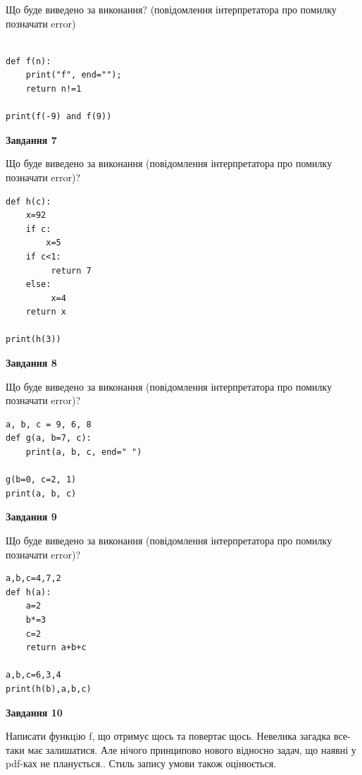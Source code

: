 \documentclass[12pt, ukrainian]{article}
\begin{document}
{\begin {large}
Що буде виведено за виконання? (повідомлення інтерпретатора про помилку позначати error)\par
\begin{verbatim}

def f(n):
    print("f", end="");
    return n!=1

print(f(-9) and f(9))
\end{verbatim}

{\begin {center}\textbf{Завдання 7}\end {center}}

Що буде виведено за виконання (повідомлення інтерпретатора про помилку позначати error)?\par
\begin{verbatim}
def h(c):
    x=92
    if c: 
        x=5
    if c<1:
         return 7
    else:
         x=4
    return x

print(h(3))
\end{verbatim}

{\begin {center}\textbf{Завдання 8}\end {center}}

Що буде виведено за виконання (повідомлення інтерпретатора про помилку позначати error)?\par
\begin{verbatim}
a, b, c = 9, 6, 8
def g(a, b=7, c):
    print(a, b, c, end=" ")

g(b=0, c=2, 1)
print(a, b, c)
\end{verbatim}

{\begin {center}\textbf{Завдання 9}\end {center}}

Що буде виведено за виконання (повідомлення інтерпретатора про помилку позначати error)?\par
\begin{verbatim}
a,b,c=4,7,2
def h(a):
    a=2
    b*=3
    c=2
    return a+b+c

a,b,c=6,3,4
print(h(b),a,b,c)
\end{verbatim}

{\begin {center}\textbf{Завдання 10}\end {center}}


Написати функцiю f, що отримує щось та повертає щось. Невелика загадка все-таки має залишатися. Але нічого принципово нового відносно задач, що наявні у pdf-ках не планується.. Стиль запису умови також оцінюється.\par
\end {large}}
\newpage
\end{document}
